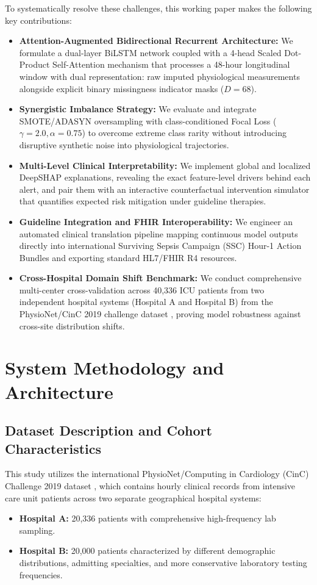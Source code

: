 \documentclass[conference]{IEEEtran}
\begin{document}
To systematically resolve these challenges, this working paper makes the following key contributions:
\begin{itemize}
    \item \textbf{Attention-Augmented Bidirectional Recurrent Architecture:} We formulate a dual-layer BiLSTM network coupled with a 4-head Scaled Dot-Product Self-Attention mechanism that processes a 48-hour longitudinal window with dual representation: raw imputed physiological measurements alongside explicit binary missingness indicator masks ($D = 68$).
    \item \textbf{Synergistic Imbalance Strategy:} We evaluate and integrate SMOTE/ADASYN oversampling with class-conditioned Focal Loss ($\gamma = 2.0, \alpha = 0.75$) to overcome extreme class rarity without introducing disruptive synthetic noise into physiological trajectories.
    \item \textbf{Multi-Level Clinical Interpretability:} We implement global and localized DeepSHAP explanations, revealing the exact feature-level drivers behind each alert, and pair them with an interactive counterfactual intervention simulator that quantifies expected risk mitigation under guideline therapies.
    \item \textbf{Guideline Integration and FHIR Interoperability:} We engineer an automated clinical translation pipeline mapping continuous model outputs directly into international Surviving Sepsis Campaign (SSC) Hour-1 Action Bundles and exporting standard HL7/FHIR R4 resources.
    \item \textbf{Cross-Hospital Domain Shift Benchmark:} We conduct comprehensive multi-center cross-validation across 40,336 ICU patients from two independent hospital systems (Hospital A and Hospital B) from the PhysioNet/CinC 2019 challenge dataset \cite{reyna2020}, proving model robustness against cross-site distribution shifts.
\end{itemize}

\section{System Methodology and Architecture}

\subsection{Dataset Description and Cohort Characteristics}
This study utilizes the international PhysioNet/Computing in Cardiology (CinC) Challenge 2019 dataset \cite{reyna2020}, which contains hourly clinical records from intensive care unit patients across two separate geographical hospital systems:
\begin{itemize}
    \item \textbf{Hospital A:} 20,336 patients with comprehensive high-frequency lab sampling.
    \item \textbf{Hospital B:} 20,000 patients characterized by different demographic distributions, admitting specialties, and more conservative laboratory testing frequencies.
\end{itemize}
\end{document}
